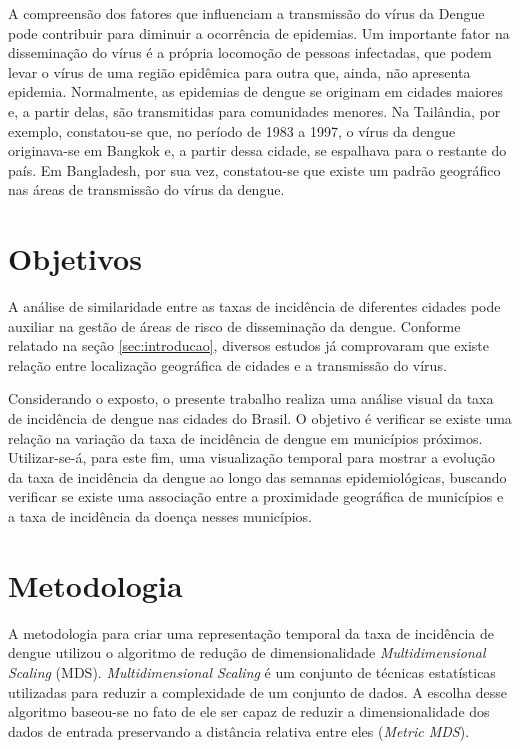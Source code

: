 \documentclass[12pt,openright,twoside,a4paper,article,brazil]{abntex2}
\begin{document}
A compreensão dos fatores que influenciam a transmissão do vírus da Dengue pode contribuir para diminuir a ocorrência de epidemias. Um importante fator na disseminação do vírus é a própria locomoção de pessoas infectadas, que podem levar o vírus de uma região epidêmica para outra que, ainda, não apresenta epidemia. Normalmente, as epidemias de dengue se originam em cidades maiores e, a partir delas, são transmitidas para comunidades menores\cite{cities-spawn-dengue}. Na Tailândia, por exemplo, constatou-se que, no período de 1983 a 1997, o vírus da dengue originava-se em Bangkok e, a partir dessa cidade, se espalhava para o restante do país\cite{travelling-dengue-thailand}. Em Bangladesh, por sua vez, constatou-se que existe um padrão geográfico nas áreas de transmissão do vírus da dengue\cite{dengue-geographic-information-system}.




\section{Objetivos}
\label{sec:objetivos}

A análise de similaridade entre as taxas de incidência de diferentes cidades pode auxiliar na gestão de áreas de risco de disseminação da dengue. Conforme relatado na seção \ref{sec:introducao}, diversos estudos já comprovaram que existe relação entre localização geográfica de cidades e a transmissão do vírus\cite{cities-spawn-dengue}\cite{travelling-dengue-thailand}\cite{dengue-geographic-information-system}.

Considerando o exposto, o presente trabalho realiza uma análise visual da taxa de incidência de dengue nas cidades do Brasil. O objetivo é verificar se existe uma relação na variação da taxa de incidência de dengue em municípios próximos. Utilizar-se-á, para este fim, uma visualização temporal para mostrar a evolução da taxa de incidência da dengue ao longo das semanas epidemiológicas, buscando verificar se existe uma associação entre a proximidade geográfica de municípios e a taxa de incidência da doença nesses municípios.


\section{Metodologia}
\label{sec:metodologia}

A metodologia para criar uma representação temporal da taxa de incidência de dengue utilizou o algoritmo de redução de dimensionalidade \emph{Multidimensional Scaling} (MDS)\cite{sklearn-mds}. \emph{Multidimensional Scaling} é um conjunto de técnicas estatísticas utilizadas para reduzir a complexidade de um conjunto de dados\cite{multidimensional-scaling-book}. A escolha desse algoritmo baseou-se no fato de ele ser capaz de reduzir a dimensionalidade dos dados de entrada preservando a distância relativa entre eles (\emph{Metric MDS}).
\end{document}
